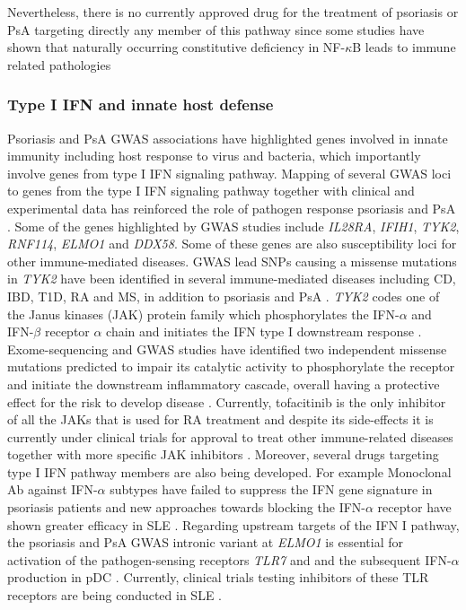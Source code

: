 Nevertheless, there is no currently approved drug for the treatment of psoriasis or PsA targeting directly any member of this pathway since some studies have shown that naturally occurring constitutive deficiency in NF-$\kappa$B leads to immune related pathologies \parencite{Orange2005,Puel2004}


\subsubsection{Type I IFN and innate host defense}
Psoriasis and PsA GWAS associations have highlighted genes involved in innate immunity including host response to virus and bacteria, which importantly involve genes from type I IFN signaling pathway. Mapping of several GWAS loci to genes from the type I IFN signaling pathway together with clinical and experimental data has reinforced the role of pathogen response psoriasis and PsA \parencite{Nextle2005}. Some of the genes highlighted by GWAS studies include \textit{IL28RA}, \textit{IFIH1}, \textit{TYK2}, \textit{RNF114}, \textit{ELMO1} and \textit{DDX58}. Some of these genes are also susceptibility loci for other immune-mediated diseases. GWAS lead SNPs causing a missense mutations in \textit{TYK2} have been identified in several immune-mediated diseases including CD, IBD, T1D, RA and MS, in addition to psoriasis and PsA \parencite{ImmunoBase}. \textit{TYK2} codes one of the Janus kinases (JAK) protein family which phosphorylates the IFN-$\alpha$ and IFN-$\beta$ receptor $\alpha$ chain and initiates the IFN type I downstream response \parencite{Calamonici1994}. Exome-sequencing and GWAS studies have identified two independent missense mutations predicted to impair its catalytic activity to phosphorylate the receptor and initiate the downstream inflammatory cascade, overall having a protective effect for the risk to develop disease \parencite{Strange2010, Tsoi2012, Dand2017}. Currently, tofacitinib is the only inhibitor of all the JAKs that is used for RA treatment \parencite{van Vollenhoven2012} and despite its side-effects it is currently under clinical trials for approval to treat other immune-related diseases together with more specific JAK inhibitors \parencite{Baker2017}. Moreover, several drugs targeting type I IFN pathway members are also being developed. For example Monoclonal Ab against IFN-$\alpha$ subtypes have failed to suppress the IFN gene signature in psoriasis patients and new approaches towards blocking the IFN-$\alpha$ receptor have shown greater efficacy in SLE \parencite{Furie2017}. Regarding upstream targets of the IFN I pathway, the psoriasis and PsA GWAS intronic variant at \textit{ELMO1} is essential for activation of the pathogen-sensing receptors \textit{TLR7} and \parencite{TLR9} and the subsequent IFN-$\alpha$ production in pDC \parencite{Tsoi2012}. Currently, clinical trials testing inhibitors of these TLR receptors are being conducted in SLE \parencite{Baker2017}.

